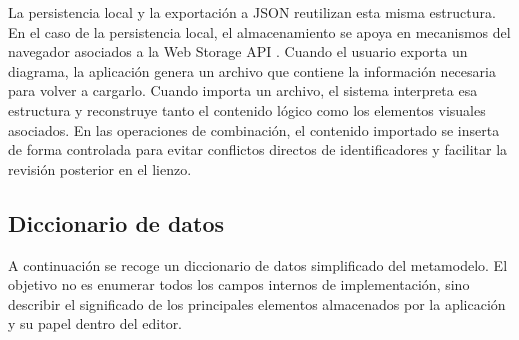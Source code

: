 La persistencia local y la exportación a JSON reutilizan esta misma estructura. En el caso de la persistencia local, el almacenamiento se apoya en mecanismos del navegador asociados a la Web Storage API \cite{mdn-web-storage}. Cuando el usuario exporta un diagrama, la aplicación genera un archivo que contiene la información necesaria para volver a cargarlo. Cuando importa un archivo, el sistema interpreta esa estructura y reconstruye tanto el contenido lógico como los elementos visuales asociados. En las operaciones de combinación, el contenido importado se inserta de forma controlada para evitar conflictos directos de identificadores y facilitar la revisión posterior en el lienzo.

\subsection{Diccionario de datos}

A continuación se recoge un diccionario de datos simplificado del metamodelo. El objetivo no es enumerar todos los campos internos de implementación, sino describir el significado de los principales elementos almacenados por la aplicación y su papel dentro del editor.

